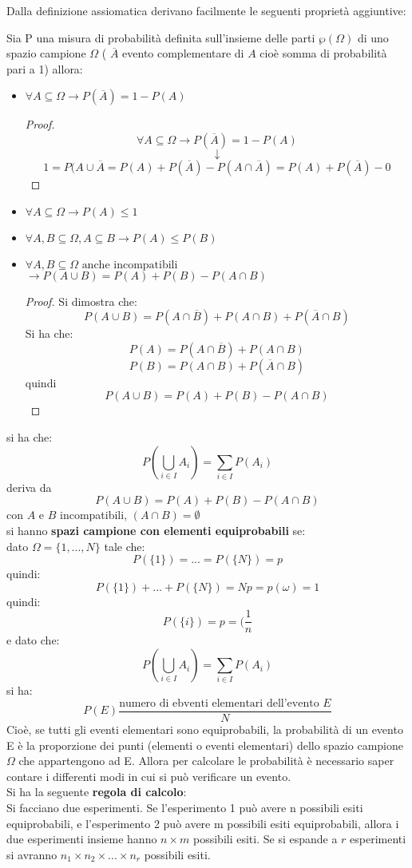 \documentclass[a4paper,12pt, oneside]{book}
\begin{document}
Dalla definizione assiomatica derivano facilmente le seguenti proprietà aggiuntive:
\begin{definizione}
Sia P una misura di probabilità definita sull'insieme delle parti $\wp(\Omega)$ di uno
spazio campione $\Omega$ ( $\overline{A}$ evento complementare di $A$ cioè somma di probabilità
pari a 1) allora:
    \begin{itemize}
        \item $\forall A\subseteq \Omega \to P(\overline{A})=1-P(A)$
              \begin{proof}
                    \[\forall A\subseteq \Omega \to P(\overline{A})=1-P(A)\]
                        \[\downarrow\]
                    \[ 1= P(A\cup \overline{A}=P(A)+P(\overline{A})-P(A\cap \overline{A})=P(A)+P(\overline{A})-0\]
              \end{proof}
        \item $\forall A\subseteq \Omega \to P(A)\leq 1$
        \item $\forall A,B\subseteq \Omega, A\subseteq B \to P(A)\leq P(B)$
        \item $\forall A,B\subseteq \Omega \mbox{ anche incompatibili }$\\ $\to P(A\cup B)=P(A)+P(B)-P(A\cap B)$
                \begin{proof}
                Si dimostra che:
                \[ P(A\cup B)=P(A\cap \overline{B})+P(A\cap B)+P(\overline{A}\cap B)\] 
                Si ha che:
                \[P(A)=P(A\cap \overline{B})+P(A\cap B) \]
                \[P(B)=P(A\cap B)+P(\overline{A}\cap B) \]
                quindi 
                \[P(A\cup B)=P(A)+P(B)-P(A\cap B)\]
                \end{proof}
    \end{itemize}
\end{definizione}
si ha che:
\[ P\left(\bigcup_{i\in I}A_i\right)=\sum_{i\in I} P(A_i)\]
deriva da 
\[P(A\cup B)=P(A)+P(B)-P(A\cap B)\]
con $A$ e $B$ incompatibili, $(A\cap B)=\emptyset$\\
si hanno \textbf{spazi campione con elementi equiprobabili} se:\\
dato $\Omega =\{1,...,N\}$ tale che:
\[P(\{1\})=...=P(\{N\})=p \]
quindi:
\[P(\{1\})+...+P(\{N\})=Np=p(\omega)=1\]
quindi:
\[P(\{i\})=p=(\frac{1}{n}\]
e dato che:
\[ P\left(\bigcup_{i\in I}A_i\right)=\sum_{i\in I} P(A_i)\]
si ha:
\[P(E)\frac{\mbox{numero di ebventi elementari dell'evento }E}{N}\]
Cioè, se tutti gli eventi elementari sono equiprobabili, la probabilità di un evento E è
la proporzione dei punti (elementi o eventi elementari) dello spazio campione $\Omega$ che
appartengono ad E. Allora per calcolare le probabilità è necessario saper contare i differenti modi in cui si
può verificare un evento.\\
Si ha la seguente \textbf{regola di calcolo}:\\
Si facciano due esperimenti. Se l'esperimento 1 può avere n
possibili esiti equiprobabili, e l'esperimento 2 può avere m possibili esiti equiprobabili, allora i
due esperimenti insieme hanno $n\times m$ possibili esiti.
Se si espande a $r$ esperimenti si avranno $n_1\times n_2\times ...\times n_r$ possibili esiti.
\end{document}
